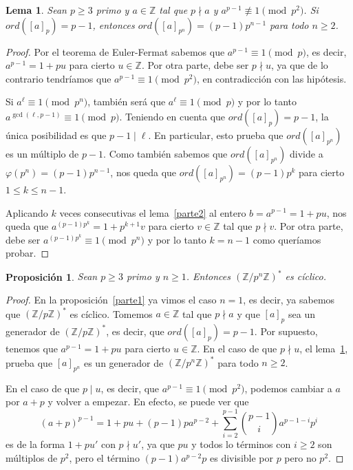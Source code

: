 \documentclass[a4paper, 11pt]{article}
\newcommand{\ZZ}{\mathbb{Z}}
\theoremstyle{plain}
\newtheorem{lema}[teor]{Lema}
\newtheorem{prop}[teor]{Proposición}
\theoremstyle{definition}
\begin{document}
\begin{lema}\label{parte3}
Sean $p\geq 3$ primo y $a\in\ZZ$ tal que $p\nmid a$ y
$a^{p-1}\not\equiv1\pmod{p^2}$. Si $ord([a]_p)=p-1$, entonces
$ord([a]_{p^n})=(p-1)p^{n-1}$ para todo $n\geq 2$.
\end{lema}
\begin{proof}
Por el teorema de Euler-Fermat sabemos que $a^{p-1}\equiv1\pmod{p}$, es decir,
$a^{p-1}=1+pu$ para cierto $u\in\ZZ$. Por otra parte, debe ser $p\nmid u$,
ya que de lo contrario tendríamos que $a^{p-1}\equiv1\pmod{p^2}$, en
contradicción con las hipótesis.

Si $a^{\ell}\equiv1\pmod{p^n}$, también será que $a^{\ell}\equiv1\pmod{p}$
y por lo tanto $a^{\gcd(\ell,p-1)}\equiv1\pmod{p}$. Teniendo en cuenta
que $ord([a]_{p})=p-1$, la única posibilidad es que $p-1\mid\ell$. En
particular, esto prueba que $ord([a]_{p^n})$ es un múltiplo de
$p-1$. Como también sabemos que $ord([a]_{p^n})$ divide a
$\varphi(p^n)=(p-1)p^{n-1}$, nos queda que $ord([a]_{p^n})=(p-1)p^k$ para
cierto $1\leq k\leq n-1$.

Aplicando $k$ veces consecutivas el lema~\ref{parte2} al entero $b=a^{p-1}=1+pu$,
nos queda que $a^{(p-1)p^k}=1+p^{k+1}v$ para cierto $v\in\ZZ$ tal que $p\nmid v$.
Por otra parte, debe ser $a^{(p-1)p^k}\equiv1\pmod{p^n}$ y por lo tanto $k=n-1$
como queríamos probar.
\end{proof}

\begin{prop}\label{parte4}
Sean $p\geq 3$ primo y $n\geq 1$. Entonces $(\ZZ/p^n\ZZ)^*$ es cíclico.
\end{prop}
\begin{proof}
En la proposición~\ref{parte1} ya vimos el caso $n=1$, es decir, ya sabemos
que $(\ZZ/p\ZZ)^*$ es cíclico. Tomemos $a\in\ZZ$ tal que $p\nmid a$ y que
$[a]_p$ sea un generador de $(\ZZ/p\ZZ)^*$, es decir, que $ord([a]_p)=p-1$.
Por supuesto, tenemos que $a^{p-1}=1+pu$ para cierto $u\in\ZZ$. En el caso
de que $p\nmid u$, el lema~\ref{parte3}, prueba que $[a]_{p^n}$ es un
generador de $(\ZZ/p^n\ZZ)^*$ para todo $n\geq 2$.

En el caso de que $p\mid u$, es decir, que $a^{p-1}\equiv 1\pmod{p^2}$, podemos
cambiar a $a$ por $a+p$ y volver a empezar. En efecto, se puede ver que
\[
   (a+p)^{p-1}=1+pu+(p-1)pa^{p-2}+\sum_{i=2}^{p-1}\binom{p-1}{i}a^{p-1-i}p^i
\]
es de la forma $1+pu'$ con $p\nmid u'$, ya que $pu$ y todos lo términos con
$i\geq 2$ son múltiplos de $p^2$, pero el término $(p-1)a^{p-2}p$ es divisible
por $p$ pero no $p^2$.
\end{proof}
\end{document}
